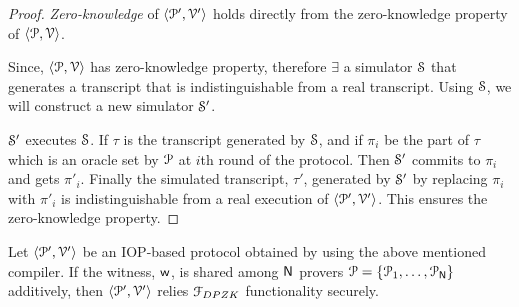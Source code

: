\begin{proof}
	\textit{Zero-knowledge} of $\langle \mathcal{P}', \mathcal{V}' \rangle$ holds directly from the zero-knowledge property of $\langle \mathcal{P}, \mathcal{V} \rangle$. 
	
	Since, $\langle \mathcal{P}, \mathcal{V} \rangle$ has zero-knowledge property, therefore $\exists$ a simulator $\mathcal{S}$ that generates a transcript that is indistinguishable from a real transcript. Using $\mathcal{S}$, we will construct a new simulator $\mathcal{S}'$. 
	
	$\mathcal{S}'$ executes $\mathcal{S}$. If $\tau$ is the transcript generated by $\mathcal{S}$, and if $\pi_i$ be the part of $\tau$ which is an oracle set by $\mathcal{P}$ at $i$th round of the protocol. Then $\mathcal{S}'$ commits to $\pi_i$ and gets $\pi'_i$. Finally the simulated transcript, $\tau'$, generated by $\mathcal{S}'$ by replacing $\pi_i$ with $\pi'_i$ is indistinguishable from a real execution of $\langle \mathcal{P}', \mathcal{V}' \rangle$. This ensures the zero-knowledge property.
\end{proof}

\begin{lemma}\label{lemma:generic_dpzk}
	Let $\langle \mathcal{P}', \mathcal{V}' \rangle$ be an IOP-based protocol obtained by using the above mentioned compiler. If the witness, $\mathsf{w}$, is shared among $\mathsf{N}$ provers $\mathcal{P} = \{\mathcal{P}_1, \ldots, \mathcal{P}_{\mathsf{N}}\}$ additively, then $\langle \mathcal{P}', \mathcal{V}' \rangle$ relies $\mathcal{F}_{DPZK}$ functionality securely.
\end{lemma}
	
